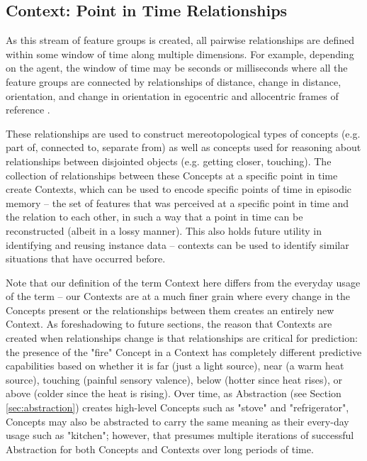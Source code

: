 \documentclass{article}
\begin{document}
\subsection{Context: Point in Time Relationships}
As this stream of feature groups is created, all pairwise relationships are defined within some window of time along multiple dimensions. For example, depending on the agent, the window of time may be seconds or milliseconds where all the feature groups are connected by relationships of distance, change in distance, orientation, and change in orientation in egocentric and allocentric frames of reference \citep{Hafri_Firestone_2021,vo_reading_2019}.

These relationships are used to construct mereotopological types of concepts (e.g. part of, connected to, separate from) as well as concepts used for reasoning about relationships between disjointed objects (e.g. getting closer, touching). The collection of relationships between these Concepts at a specific point in time create Contexts, which can be used to encode specific points of time in episodic memory -- the set of features that was perceived at a specific point in time and the relation to each other, in such a way that a point in time can be reconstructed (albeit in a lossy manner). This also holds future utility in identifying and reusing instance data -- contexts can be used to identify similar situations that have occurred before.

Note that our definition of the term Context here differs from the everyday usage of the term -- our Contexts are at a much finer grain where every change in the Concepts present or the relationships between them creates an entirely new Context. As foreshadowing to future sections, the reason that Contexts are created when relationships change is that relationships are critical for prediction: the presence of the "fire" Concept in a Context has completely different predictive capabilities based on whether it is far (just a light source), near (a warm heat source), touching (painful sensory valence), below (hotter since heat rises), or above (colder since the heat is rising). Over time, as Abstraction (see Section \ref{sec:abstraction}) creates high-level Concepts such as "stove" and "refrigerator", Concepts may also be abstracted to carry the same meaning as their every-day usage such as "kitchen"; however, that presumes multiple iterations of successful Abstraction for both Concepts and Contexts over long periods of time.
\end{document}

